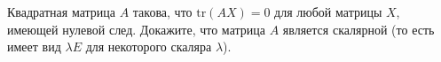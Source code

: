 \documentclass{article}
\begin{document}
Квадратная матрица $A$ такова, что $\mathrm{tr}(AX)=0$ для любой матрицы $X$, имеющей нулевой след. Докажите, что матрица $A$ является скалярной 
(то есть имеет вид $\lambda E$ для некоторого скаляра $\lambda$).
\end{document}
